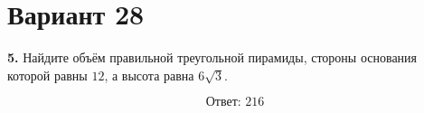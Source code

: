 \documentclass[12pt,a4paper]{article}
\begin{document}
\section*{Вариант 28}

\textbf{5.} Найдите объём правильной треугольной пирамиды, стороны основания
которой равны \(12\), а высота равна \(6\sqrt{3}\).

\begin{center}
\end{center}

\[
\boxed{\text{Ответ: }216}
\]
\end{document}
